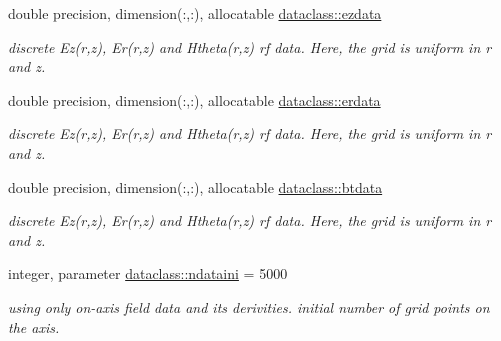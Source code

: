 \textbf{ }\par
\begin{DoxyCompactItemize}
\item 
double precision, dimension(\+:,\+:), allocatable \mbox{\hyperlink{namespacedataclass_a2f3f7950dbca31f394856d31781256f3}{dataclass\+::ezdata}}
\begin{DoxyCompactList}\small\item\em discrete Ez(r,z), Er(r,z) and Htheta(r,z) rf data. Here, the grid is uniform in r and z. \end{DoxyCompactList}\item 
double precision, dimension(\+:,\+:), allocatable \mbox{\hyperlink{namespacedataclass_a4f3abc6db52a89363b184d4bec9ebff8}{dataclass\+::erdata}}
\begin{DoxyCompactList}\small\item\em discrete Ez(r,z), Er(r,z) and Htheta(r,z) rf data. Here, the grid is uniform in r and z. \end{DoxyCompactList}\item 
double precision, dimension(\+:,\+:), allocatable \mbox{\hyperlink{namespacedataclass_a09d27eeab42c3e3369268d8ce133a2c0}{dataclass\+::btdata}}
\begin{DoxyCompactList}\small\item\em discrete Ez(r,z), Er(r,z) and Htheta(r,z) rf data. Here, the grid is uniform in r and z. \end{DoxyCompactList}\end{DoxyCompactItemize}

\textbf{ }\par
\begin{DoxyCompactItemize}
\item 
integer, parameter \mbox{\hyperlink{namespacedataclass_a2578bbe9c4dc0892ee08a8619cd7e978}{dataclass\+::ndataini}} = 5000
\begin{DoxyCompactList}\small\item\em using only on-\/axis field data and its derivities. initial number of grid points on the axis. \end{DoxyCompactList}\end{DoxyCompactItemize}

